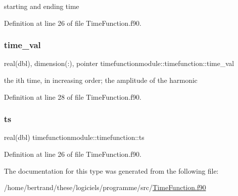 starting and ending time 



Definition at line 26 of file Time\+Function.\+f90.

\mbox{\label{structtimefunctionmodule_1_1timefunction_abad80cdb684de5f31a51015b9d88751f}} 
\subsubsection{\texorpdfstring{time\+\_\+val}{time\_val}}
{\footnotesize\ttfamily real(dbl), dimension(\+:), pointer timefunctionmodule\+::timefunction\+::time\+\_\+val\hspace{0.3cm}{\ttfamily [private]}}



the ith time, in increasing order; the amplitude of the harmonic 



Definition at line 28 of file Time\+Function.\+f90.

\mbox{\label{structtimefunctionmodule_1_1timefunction_a62e761e489833d17dcd1dbcac5c1dfd6}} 
\subsubsection{\texorpdfstring{ts}{ts}}
{\footnotesize\ttfamily real(dbl) timefunctionmodule\+::timefunction\+::ts\hspace{0.3cm}{\ttfamily [private]}}



Definition at line 26 of file Time\+Function.\+f90.



The documentation for this type was generated from the following file\+:\begin{DoxyCompactItemize}
\item 
/home/bertrand/these/logiciels/programme/src/\hyperlink{_time_function_8f90}{Time\+Function.\+f90}\end{DoxyCompactItemize}
